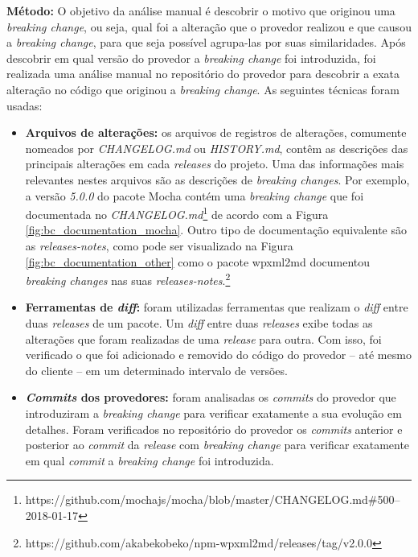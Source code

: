 \noindent
\textbf{Método:}
O objetivo da análise manual é descobrir o motivo que originou uma \textit{breaking change}, ou seja, qual foi a alteração que o provedor realizou e que causou a \textit{breaking change}, para que seja possível agrupa-las por suas similaridades. Após descobrir em qual versão do provedor a \textit{breaking change} foi introduzida, foi realizada uma análise manual no repositório do provedor para descobrir a exata alteração no código que originou a \textit{breaking change}. As seguintes técnicas foram usadas:

\begin{itemize}
    \item \textbf{Arquivos de alterações:} os arquivos de registros de alterações, comumente nomeados por \textit{CHANGELOG.md} ou \textit{HISTORY.md}, contêm as descrições das principais alterações em cada \textit{releases} do projeto. Uma das informações mais relevantes nestes arquivos são as descrições de \textit{breaking changes}. Por exemplo, a versão \textit{5.0.0} do pacote \textsf{Mocha} contém uma \textit{breaking change} que foi documentada no \textit{CHANGELOG.md}\footnote{https://github.com/mochajs/mocha/blob/master/CHANGELOG.md\#500--2018-01-17} de acordo com a Figura \ref{fig:bc_documentation_mocha}. Outro tipo de documentação equivalente são as \textit{releases-notes}, como pode ser visualizado na Figura \ref{fig:bc_documentation_other} como o pacote \textsf{wpxml2md} documentou \textit{breaking changes} nas suas \textit{releases-notes}.\footnote{https://github.com/akabekobeko/npm-wpxml2md/releases/tag/v2.0.0}

    \item \textbf{Ferramentas de \textit{diff}:} foram utilizadas ferramentas que realizam o  \textit{diff} entre duas \textit{releases} de um pacote. Um \textit{diff} entre duas \textit{releases} exibe todas as alterações que foram realizadas de uma \textit{release} para outra. Com isso, foi verificado o que foi adicionado e removido do código do provedor -- até mesmo do cliente -- em um determinado intervalo de versões.

    \item \textbf{\textit{Commits} dos provedores:} foram analisadas os \textit{commits} do provedor que introduziram a \textit{breaking change} para verificar exatamente a sua evolução em detalhes. Foram verificados no repositório do provedor os \textit{commits} anterior e posterior ao \textit{commit} da \textit{release} com \textit{breaking change} para verificar exatamente em qual \textit{commit} a \textit{breaking change} foi introduzida.
\end{itemize}

